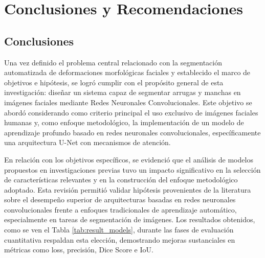 \chapter{Conclusiones y Recomendaciones}
\section{Conclusiones}
Una vez definido el problema central relacionado con la segmentación automatizada de deformaciones morfológicas faciales y establecido el marco de objetivos e hipótesis, se logró cumplir con el propósito general de esta investigación: diseñar un sistema capaz de segmentar arrugas y manchas en imágenes faciales mediante Redes Neuronales Convolucionales. Este objetivo se abordó considerando como criterio principal el uso exclusivo de imágenes faciales humanas y, como enfoque metodológico, la implementación de un modelo de aprendizaje profundo basado en redes neuronales convolucionales, específicamente una arquitectura U-Net con mecanismos de atención.

En relación con los objetivos específicos, se evidenció que el análisis de modelos propuestos en investigaciones previas tuvo un impacto significativo en la selección de características relevantes y en la construcción del enfoque metodológico adoptado. Esta revisión permitió validar hipótesis provenientes de la literatura sobre el desempeño superior de arquitecturas basadas en redes neuronales convolucionales frente a enfoques tradicionales de aprendizaje automático, especialmente en tareas de segmentación de imágenes. Los resultados obtenidos, como se ven el Tabla \ref{tab:result_models}, durante las fases de evaluación cuantitativa respaldan esta elección, demostrando mejoras sustanciales en métricas como loss, precisión, Dice Score e IoU.

